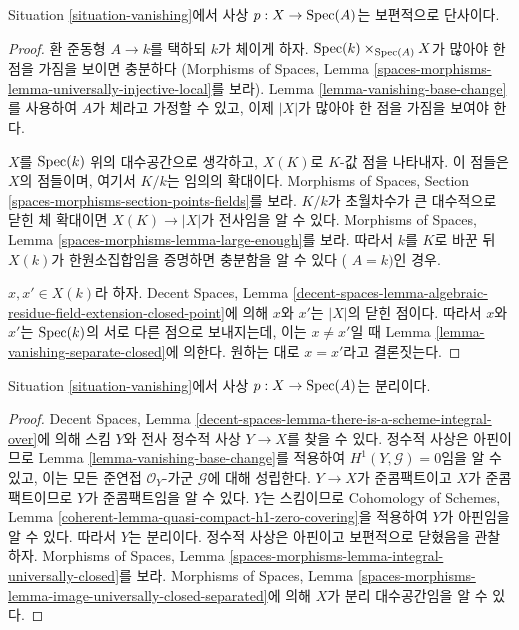 \begin{lemma}
\label{lemma-vanishing-injective}
Situation \ref{situation-vanishing}에서 사상 $p : X \to \mathop{\mathrm{Spec}}(A)$는
보편적으로 단사이다.
\end{lemma}

\begin{proof}
환 준동형 $A \to k$를 택하되 $k$가 체이게 하자.
$\mathop{\mathrm{Spec}}(k) \times_{\mathop{\mathrm{Spec}}(A)} X$가 많아야 한 점을 가짐을 보이면 충분하다
(Morphisms of Spaces, Lemma
\ref{spaces-morphisms-lemma-universally-injective-local}를 보라).
Lemma \ref{lemma-vanishing-base-change}를 사용하여 $A$가 체라고 가정할
수 있고, 이제 $|X|$가 많아야 한 점을 가짐을 보여야 한다.

\medskip\noindent
$X$를 $\mathop{\mathrm{Spec}}(k)$ 위의 대수공간으로 생각하고, $X(K)$로 $K$-값 점을
나타내자. 이 점들은 $X$의 점들이며, 여기서 $K/k$는 임의의 확대이다. Morphisms of Spaces,
Section \ref{spaces-morphisms-section-points-fields}를 보라.
$K/k$가 초월차수가 큰 대수적으로 닫힌 체 확대이면
$X(K) \to |X|$가 전사임을 알 수 있다. Morphisms of Spaces, Lemma
\ref{spaces-morphisms-lemma-large-enough}를 보라. 따라서 $k$를 $K$로
바꾼 뒤 $X(k)$가 한원소집합임을 증명하면 충분함을 알 수 있다
(%
$A = k)$인 경우.

\medskip\noindent
$x, x' \in X(k)$라 하자. Decent Spaces, Lemma
\ref{decent-spaces-lemma-algebraic-residue-field-extension-closed-point}에 의해
$x$와 $x'$는 $|X|$의 닫힌 점이다. 따라서 $x$와 $x'$는
$\mathop{\mathrm{Spec}}(k)$의 서로 다른 점으로 보내지는데, 이는 $x \not = x'$일 때
Lemma \ref{lemma-vanishing-separate-closed}에 의한다. 원하는 대로 $x = x'$라고
결론짓는다.
\end{proof}

\begin{lemma}
\label{lemma-vanishing-separated}
Situation \ref{situation-vanishing}에서 사상 $p : X \to \mathop{\mathrm{Spec}}(A)$는
분리이다.
\end{lemma}

\begin{proof}
Decent Spaces, Lemma
\ref{decent-spaces-lemma-there-is-a-scheme-integral-over}에 의해 스킴 $Y$와
전사 정수적 사상 $Y \to X$를 찾을 수 있다. 정수적 사상은 아핀이므로
Lemma \ref{lemma-vanishing-base-change}를 적용하여
$H^1(Y, \mathcal{G}) = 0$임을 알 수 있고, 이는 모든 준연접
$\mathcal{O}_Y$-가군 $\mathcal{G}$에 대해 성립한다. $Y \to X$가 준콤팩트이고
$X$가 준콤팩트이므로 $Y$가 준콤팩트임을 알 수 있다. $Y$는 스킴이므로
Cohomology of Schemes, Lemma
\ref{coherent-lemma-quasi-compact-h1-zero-covering}을 적용하여 $Y$가
아핀임을 알 수 있다. 따라서 $Y$는 분리이다. 정수적 사상은 아핀이고
보편적으로 닫혔음을 관찰하자. Morphisms of Spaces, Lemma
\ref{spaces-morphisms-lemma-integral-universally-closed}를 보라.
Morphisms of Spaces, Lemma
\ref{spaces-morphisms-lemma-image-universally-closed-separated}에 의해
$X$가 분리 대수공간임을 알 수 있다.
\end{proof}

